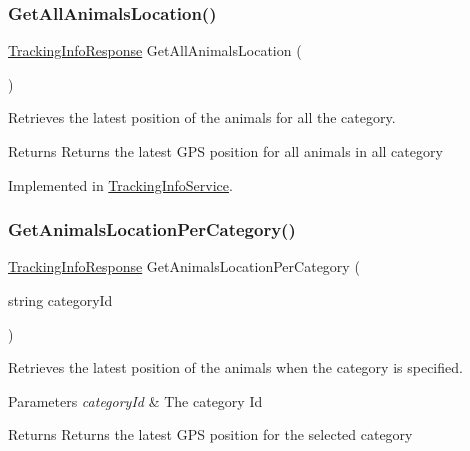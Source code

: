 \subsubsection{\texorpdfstring{Get\+All\+Animals\+Location()}{GetAllAnimalsLocation()}}
{\footnotesize\ttfamily \hyperlink{classWildLifeTracker_1_1Response_1_1TrackingInfoResponse}{Tracking\+Info\+Response} Get\+All\+Animals\+Location (\begin{DoxyParamCaption}{ }\end{DoxyParamCaption})}



Retrieves the latest position of the animals for all the category. \begin{DoxyReturn}{Returns}
Returns the latest G\+PS position for all animals in all category
\end{DoxyReturn}




Implemented in \hyperlink{classWildLifeTracker_1_1Services_1_1TrackingInfoService_a858073f81f74fcdf93b69fe464b13e84}{Tracking\+Info\+Service}.

\mbox{\label{interfaceWildLifeTracker_1_1Services_1_1ITrackingInfoService_af4b4cf67d3e3a8ec3e01041262c8f13a}} 
\subsubsection{\texorpdfstring{Get\+Animals\+Location\+Per\+Category()}{GetAnimalsLocationPerCategory()}}
{\footnotesize\ttfamily \hyperlink{classWildLifeTracker_1_1Response_1_1TrackingInfoResponse}{Tracking\+Info\+Response} Get\+Animals\+Location\+Per\+Category (\begin{DoxyParamCaption}\item[{string}]{category\+Id }\end{DoxyParamCaption})}



Retrieves the latest position of the animals when the category is specified. 
\begin{DoxyParams}{Parameters}
{\em category\+Id} & The category Id\\
\hline
\end{DoxyParams}
\begin{DoxyReturn}{Returns}
Returns the latest G\+PS position for the selected category
\end{DoxyReturn}




